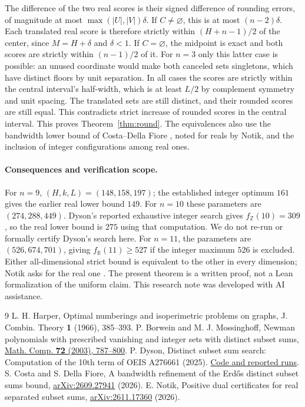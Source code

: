 \documentclass[11pt,letterpaper]{article}
\begin{document}
The difference of the two real scores is their signed difference
of rounding errors, of magnitude at most
\(\max(|U|,|V|)\delta\). If \(C\ne\varnothing\), this is
at most \((n-2)\delta\). Each translated real score is therefore
strictly within \((H+n-1)/2\) of the center, since \(M=H+\delta\)
and \(\delta<1\). If \(C=\varnothing\), the midpoint is exact
and both scores are strictly within \((n-1)/2\) of it.
For \(n=3\) only this latter case is possible: an unused
coordinate would make both canceled sets singletons, which have
distinct floors by unit separation. In all cases the scores are
strictly within the central interval's half-width, which is at
least \(L/2\) by complement symmetry and unit spacing.
The translated sets are still distinct, and their rounded
scores are still equal. This contradicts strict increase of
rounded scores in the central interval. This proves Theorem~\ref{thm:round}. The equivalences
also use the bandwidth lower bound of Costa--Della Fiore
\cite{cdf}, noted for reals by Notik, and the inclusion of
integer configurations among real ones.

\paragraph{Consequences and verification scope.}
For \(n=9\), \((H,k,L)=(148,158,197)\); the established
integer optimum \(161\) \cite{bm} gives the earlier real
lower bound \(149\). For \(n=10\) these parameters are
\((274,288,449)\). Dyson's reported exhaustive integer search
gives \(f_{\mathbb Z}(10)=309\) \cite{dyson}, so the real lower
bound is \(275\) using that computation. We do not re-run or
formally certify Dyson's search here. For \(n=11\), the parameters
are \((526,674,701)\), giving \(f_{\mathbb R}(11)\ge527\) if
the integer maximum \(526\) is excluded. Either all-dimensional
strict bound is equivalent to the other in every dimension;
Notik asks for the real one \cite[\S7, Problem 4]{notik}.
The present theorem is a written proof, not a Lean formalization
of the uniform claim. This research note was developed with AI
assistance.

\begin{thebibliography}{9}
 L. H. Harper, Optimal numberings and isoperimetric
problems on graphs, J. Combin. Theory \textbf{1} (1966), 385--393.
 P. Borwein and M. J. Mossinghoff, Newman polynomials
with prescribed vanishing and integer sets with distinct subset
sums, \href{https://www.cecm.sfu.ca/~pborwein/PAPERS/P170.pdf}{Math. Comp. \textbf{72} (2003), 787--800}.
 P. Dyson, Distinct subset sum search: Computation
of the 10th term of OEIS A276661 (2025).
\href{https://github.com/pwdyson/erdos_1}{Code and reported runs}.
 S. Costa and S. Della Fiore, A bandwidth refinement
of the Erd\H{o}s distinct subset sums bound,
\href{https://arxiv.org/abs/2609.27941}{arXiv:2609.27941} (2026).
 E. Notik, Positive dual certificates for real
separated subset sums,
\href{https://arxiv.org/abs/2611.17360}{arXiv:2611.17360} (2026).
\end{thebibliography}
\end{document}
